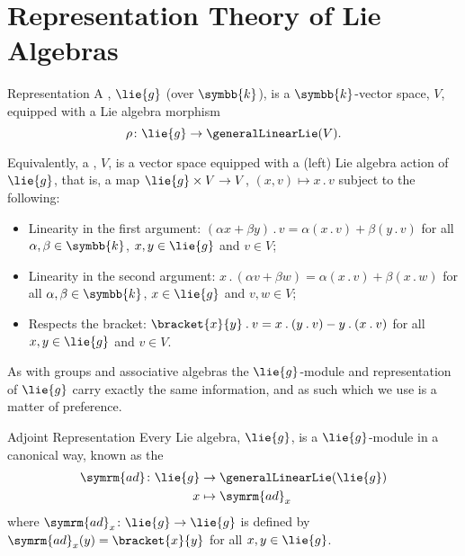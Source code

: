 \documentclass[fleqn]{NotesClass}
\renewcommand{\field}{\symbb{k}}
\newcommand{\action}{\mathbin{.}}
\newcommand{\ad}{\symrm{ad}}
\begin{document}
    \section{Representation Theory of Lie Algebras}
    \begin{dfn}{Representation}{}
        A , \(\lie{g}\) (over \(\field\)), is a \(\field\)-vector space, \(V\), equipped with a Lie algebra morphism
        \begin{equation}
            \rho \colon \lie{g} \to \generalLinearLie(V).
        \end{equation}
        
        Equivalently, a , \(V\), is a vector space equipped with a (left) Lie algebra action of \(\lie{g}\), that is, a map \(\lie{g} \times V \to V\), \((x, v) \mapsto x \action v\) subject to the following:
        \begin{itemize}
            \item Linearity in the first argument: \((\alpha x + \beta y) \action v = \alpha (x \action v) + \beta (y \action v)\) for all \(\alpha, \beta \in \field\), \(x, y \in \lie{g}\) and \(v \in V\);
            \item Linearity in the second argument: \(x \action (\alpha v + \beta w) = \alpha(x \action v) + \beta(x \action w)\) for all \(\alpha, \beta \in \field\), \(x \in \lie{g}\) and \(v, w \in V\);
            \item Respects the bracket: \(\bracket{x}{y} \action v = x \action (y \action v) - y \action (x \action v)\) for all \(x, y \in \lie{g}\) and \(v \in V\).
        \end{itemize}
    \end{dfn}
    
    As with groups and associative algebras the \(\lie{g}\)-module and representation of \(\lie{g}\) carry exactly the same information, and as such which we use is a matter of preference.
    
    \begin{dfn}{Adjoint Representation}{}
        Every Lie algebra, \(\lie{g}\), is a \(\lie{g}\)-module in a canonical way, known as the 
        \begin{equation}
            \begin{aligned}
                \ad \colon \lie{g} &\to \generalLinearLie(\lie{g})\\
                x &\mapsto \ad_x
            \end{aligned}
        \end{equation}
        where \(\ad_x \colon \lie{g} \to \lie{g}\) is defined by \(\ad_x(y) = \bracket{x}{y}\) for all \(x, y \in \lie{g}\).
    \end{dfn}
    
\end{document}
